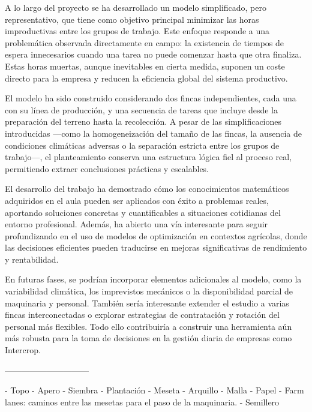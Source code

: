A lo largo del proyecto se ha desarrollado un modelo simplificado, pero representativo,
que tiene como objetivo principal minimizar las horas improductivas entre los grupos de trabajo.
Este enfoque responde a una problemática observada directamente en campo:
la existencia de tiempos de espera innecesarios cuando una tarea no puede comenzar hasta que otra finaliza.
Estas horas muertas, aunque inevitables en cierta medida, suponen un coste directo para la empresa y reducen la eficiencia global del sistema productivo.

El modelo ha sido construido considerando dos fincas independientes, cada una con su línea de producción,
y una secuencia de tareas que incluye desde la preparación del terreno hasta la recolección.
A pesar de las simplificaciones introducidas —como la homogeneización del tamaño de las fincas,
la ausencia de condiciones climáticas adversas o la separación estricta entre los grupos de trabajo—, el planteamiento conserva una estructura lógica fiel al proceso real,
permitiendo extraer conclusiones prácticas y escalables.

El desarrollo del trabajo ha demostrado cómo los conocimientos matemáticos adquiridos en el aula pueden ser aplicados con éxito a problemas reales,
aportando soluciones concretas y cuantificables a situaciones cotidianas del entorno profesional.
Además, ha abierto una vía interesante para seguir profundizando en el uso de modelos de optimización en contextos agrícolas,
donde las decisiones eficientes pueden traducirse en mejoras significativas de rendimiento y rentabilidad.

En futuras fases, se podrían incorporar elementos adicionales al modelo, como la variabilidad climática,
los imprevistos mecánicos o la disponibilidad parcial de maquinaria y personal.
También sería interesante extender el estudio a varias fincas interconectadas o explorar estrategias de contratación y rotación del personal más flexibles.
Todo ello contribuiría a construir una herramienta aún más robusta para la toma de decisiones en la gestión diaria de empresas como Intercrop.

\newpage
------------------------------

- Topo
- Apero
- Siembra
- Plantación
- Meseta
- Arquillo
- Malla
- Papel
- Farm lanes: caminos entre las mesetas para el paso de la maquinaria.
- Semillero

